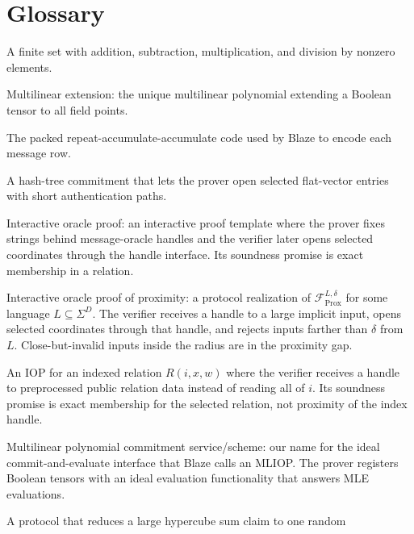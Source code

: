 \section{Glossary}

\begin{description}[leftmargin=0.3in,style=nextline]
  \item[Finite field.]
        A finite set with addition, subtraction, multiplication, and division by
        nonzero elements.
  \item[MLE.]
        Multilinear extension: the unique multilinear polynomial extending a
        Boolean tensor to all field points.
  \item[RAA/PRAA.]
        The packed repeat-accumulate-accumulate code used by Blaze to encode
        each message row.
  \item[Merkle commitment.]
        A hash-tree commitment that lets the prover open selected flat-vector
        entries with short authentication paths.
  \item[IOP.]
        Interactive oracle proof: an interactive proof template where the prover
        fixes strings behind message-oracle handles and the
        verifier later opens selected coordinates through the handle
        interface.  Its soundness promise is exact membership in a relation.
  \item[IOPP.]
        Interactive oracle proof of proximity: a protocol realization of
        \(\mathcal F_{\mathrm{Prox}}^{L,\delta}\) for some language
        \(L\subseteq\Sigma^D\).  The verifier receives a handle to a large
        implicit input, opens selected coordinates through that handle, and
        rejects inputs farther than \(\delta\) from \(L\).  Close-but-invalid
        inputs inside the radius are in the proximity gap.
  \item[Holographic IOP.]
        An IOP for an indexed relation \(R(i,x,w)\) where the verifier receives
        a handle to preprocessed public relation data instead of reading all of
        \(i\).  Its soundness promise is exact membership for the selected
        relation, not proximity of the index handle.
  \item[MLPCS.]
        Multilinear polynomial commitment service/scheme: our name for the
        ideal commit-and-evaluate interface that Blaze calls an MLIOP.  The
        prover registers Boolean tensors with an ideal evaluation functionality
        that answers MLE evaluations.
  \item[Sumcheck.]
        A protocol that reduces a large hypercube sum claim to one random

\end{description}
